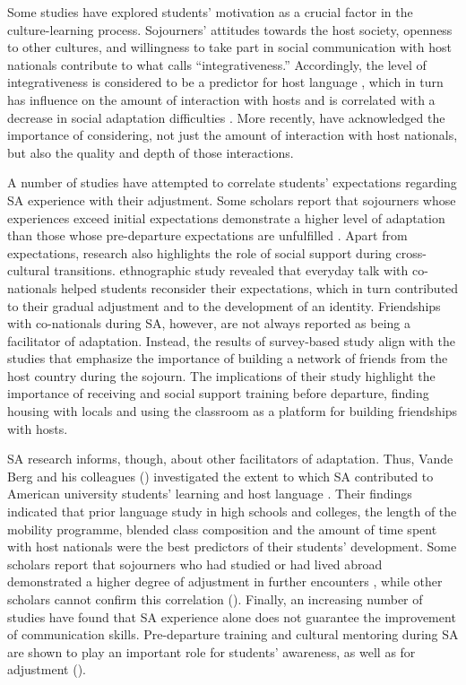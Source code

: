 \documentclass[output=paper]{langsci/langscibook}
\begin{document}
Some studies have explored students’ motivation as a crucial factor in the culture-learning process. Sojourners’ attitudes towards the host society, openness to other cultures, and willingness to take part in social communication with host nationals contribute to what \citet{Gardner1985} calls “integrativeness.” Accordingly, the level of integrativeness is considered to be a predictor for host language , which in turn has influence on the amount of interaction with hosts and is correlated with a decrease in social adaptation difficulties \citep{Ward2004}. More recently, \citet{BadstübnerEcke2009} have acknowledged the importance of considering, not just the amount of interaction with host nationals, but also the quality and depth of those interactions. 

A number of studies have attempted to correlate students’ expectations regarding SA experience with their adjustment. Some scholars report that sojourners whose experiences exceed initial expectations demonstrate a higher level of adaptation than those whose pre-departure expectations are unfulfilled \citep{Ward2004}. Apart from expectations, research also highlights the role of social support during cross-cultural transitions.  ethnographic study revealed that everyday talk with co-nationals helped students reconsider their expectations, which in turn contributed to their gradual adjustment and to the development of an  identity. Friendships with co-nationals during SA, however, are not always reported as being a facilitator of adaptation. Instead, the results of  survey-based study align with the studies that emphasize the importance of building a network of friends from the host country during the sojourn. The implications of their study highlight the importance of receiving  and social support training before departure, finding housing with locals and using the classroom as a platform for building friendships with hosts.  

SA research informs, though, about other facilitators of adaptation. Thus, Van\-de Berg and his colleagues (\citeyear{VandeBergEtAl2009}) investigated the extent to which SA contributed to American university students’  learning and host language . Their findings indicated that prior language study in high schools and colleges, the length of the mobility programme, blended class composition and the amount of time spent with host nationals were the best predictors of their students’  development.  Some scholars report that sojourners who had studied or had lived abroad demonstrated a higher degree of adjustment in further  encounters \citep{Ward2004}, while other scholars cannot confirm this correlation (\citealt{VandeBergEtAl2009}). Finally, an increasing number of studies have found that SA experience alone does not guarantee the improvement of  communication skills. Pre-departure  training and cultural mentoring during SA are shown to play an important role for students’ awareness, as well as for adjustment (\citealt{Williams2005,Jackson2008a,VandeBergEtAl2009}).
\end{document}
